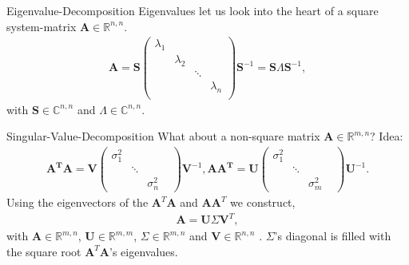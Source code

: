 \documentclass[notes]{beamer}
\begin{document}
  \begin{frame}{Eigenvalue-Decomposition \cite{strang2009introduction}}
  Eigenvalues let us look into the heart of a square system-matrix $\mathbf{A} \in \mathbb{R}^{n,n}$.
    \begin{align}
      \mathbf{A} 
      = \mathbf{S}\begin{pmatrix}
        \lambda_1 & & & \\
        & \lambda_2 & & \\
        & & \ddots    & \\
        & & & \lambda_n \\     
      \end{pmatrix}
      \mathbf{S}^{-1}
      =\mathbf{S}\Lambda \mathbf{S}^{-1},
    \end{align}
    with $\mathbf{S} \in \mathbb{C}^{n,n}$ and $\Lambda \in \mathbb{C}^{n,n}$. 
  \end{frame}

  \begin{frame}{Singular-Value-Decomposition \cite{strang2009introduction}}
    What about a non-square matrix $\mathbf{A} \in \mathbb{R}^{m,n}$? Idea:
    \begin{align}
      \mathbf{A^T}\mathbf{A} = \mathbf{V}
      \begin{pmatrix}
      \sigma_1^2 & & \\
      & \ddots & & \\
      & & \sigma_n^2   
      \end{pmatrix}
      \mathbf{V}^{-1},
      \mathbf{A}\mathbf{A^T} = \mathbf{U}
      \begin{pmatrix}
      \sigma_1^2 & & \\
      & \ddots & & \\
      & & \sigma_m^2   
      \end{pmatrix}
      \mathbf{U}^{-1}.
    \end{align}
    Using the eigenvectors of the $\mathbf{A}^T\mathbf{A}$ and $\mathbf{A}\mathbf{A}^T$ we construct, 
    \begin{align}
      \mathbf{A} = \mathbf{U}\Sigma \mathbf{V}^T,
    \end{align}
    with $\mathbf{A} \in \mathbb{R}^{m,n}$, $\mathbf{U} \in \mathbb{R}^{m,m}$, $\Sigma \in \mathbb{R}^{m,n}$ and $\mathbf{V} \in \mathbb{R}^{n,n}$ . $\Sigma$'s diagonal is filled with the square root $\mathbf{A}^T \mathbf{A}$'s eigenvalues. 
  \end{frame}
\end{document}

